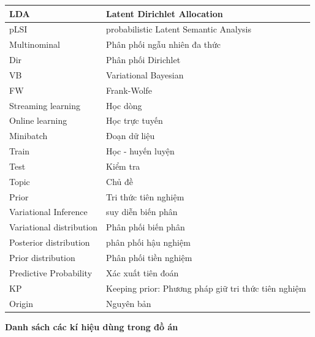 \documentclass[fontsize=13pt]{scrartcl}
\begin{document}
\begin{table}[H]
\begin{center}
\begin{tabular}{|l|l|}
\hline 
LDA & Latent Dirichlet Allocation \\
\hline 
pLSI & probabilistic Latent Semantic Analysis\\
\hline
Multinominal & Phân phối ngẫu nhiên đa thức\\
\hline
Dir & Phân phối Dirichlet \\
\hline
VB & Variational Bayesian \\
\hline
FW & Frank-Wolfe\\
\hline
Streaming learning & Học dòng\\
\hline
Online learning & Học trực tuyến\\
\hline 
Minibatch & Đoạn dữ liệu\\
\hline 
Train & Học - huyến luyện\\
\hline
Test & Kiểm tra\\
\hline
Topic & Chủ đề\\
\hline
Prior & Tri thức tiên nghiệm\\
\hline
Variational Inference & suy diễn biến phân \\
\hline
Variational distribution & Phân phối biến phân \\
\hline
Posterior distribution & phân phối hậu nghiệm \\
\hline
Prior distribution & Phân phối tiền nghiệm \\
\hline
Predictive Probability & Xác xuất tiên đoán\\
\hline
KP & Keeping prior: Phương pháp giữ tri thức tiên nghiệm\\
\hline
Origin & Nguyên bản\\

\hline 
\end{tabular}
\end{center}
\end{table}
\newpage
\textbf{Danh sách các kí hiệu dùng trong đồ án}
\end{document}
